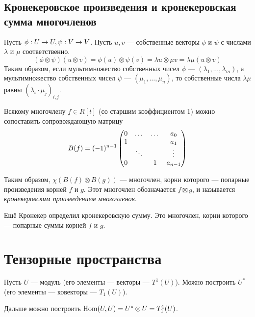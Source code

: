 \subsection{Кронекеровское произведения и кронекеровская сумма многочленов}
Пусть $\phi: U \rightarrow U, \psi: V \rightarrow V$.
Пусть $u, v$ --- собственные векторы $\phi$ и $\psi$ с числами $\lambda$ и $\mu$ соответственно.
\[(\phi \otimes \psi)(u \otimes v) = \phi(u) \otimes \psi(v) = \lambda u \otimes \mu v = \lambda \mu(u \otimes v)\]
Таким образом, если мультимножество собственных чисел $\phi$ --- $(\lambda_1, \dots, \lambda_m)$, а мультимножество собственных чисел $\psi$ --- $(\mu_1, \dots, \mu_n)$, то собственные числа $\lambda\mu$ равны $(\lambda_i\cdot \mu_j)_{i,j}$.

Всякому многочлену $f \in R[t]$ (со старшим коэффициентом 1) можно сопоставить сопровождающую матрицу
\[B(f) = (-1)^{n-1}\begin{pmatrix}0 & \dots & \dots & a_0 \\ 1 & & & a_1 \\ & \ddots & &\vdots\\ 0 & & 1 & a_{n-1}\end{pmatrix}\]

Таким образом, $\chi(B(f) \otimes B(g))$ --- многочлен, корни которого --- попарные произведения корней $f$ и $g$.
Этот многочлен обозначается $f \boxtimes g$, и называется \emph{кронекеровским произведением многочленов}.

Ещё Кронекер определил кронекеровскую сумму.
Это многочлен, корни которого --- попарные суммы корней $f$ и $g$.


\section{Тензорные пространства}
Пусть $U$ --- модуль (его элементы --- векторы --- $T^1(U)$).
Можно построить $U^*$ (его элементы --- ковекторы --- $T_1(U)$).

Дальше можно построить $\operatorname{Hom}(U, U) = U^* \otimes U = T^1_1(U)$.


